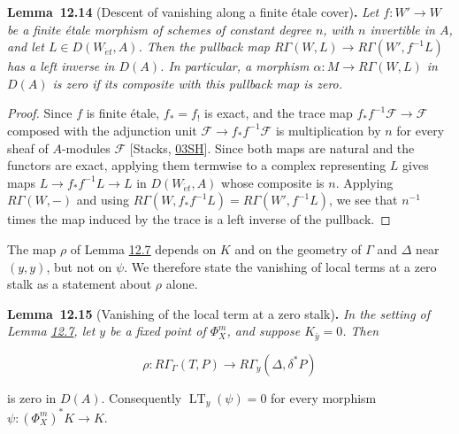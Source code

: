 \documentclass[11pt]{article}
\newenvironment{bpstatement}[2]{\par\addvspace{0.6\baselineskip}\noindent\textbf{#1}#2\textbf{.}\enspace\ignorespaces}
  {\par\addvspace{0.4\baselineskip}}
\newenvironment{bpstatementit}[2]{\begin{bpstatement}{#1}{#2}\itshape\ignorespaces}{\end{bpstatement}}
\begin{document}
\label{bp267}%
\begin{bpstatementit}{Lemma~12.14}{ (Descent of vanishing along a finite étale cover)}
Let \(f:W'\to W\) be a finite étale morphism of schemes of constant degree \(n\), with \(n\) invertible in \(A\), and let \(L\in D(W_{\acute{e}t},A)\). Then the pullback map \(R\Gamma(W,L)\to R\Gamma(W',f^{-1}L)\) has a left inverse in \(D(A)\). In particular, a morphism \(\alpha:M\to R\Gamma(W,L)\) in \(D(A)\) is zero if its composite with this pullback map is zero.
\end{bpstatementit}

\begin{proof}[{Proof}]\label{bp268}%
Since \(f\) is finite étale, \(f_*=f_!\) is exact, and the trace map \(f_*f^{-1}\mathcal F\to\mathcal F\) composed with the adjunction unit \(\mathcal F\to f_*f^{-1}\mathcal F\) is multiplication by \(n\) for every sheaf of \(A\)-modules \(\mathcal F\) [Stacks, \href{https://stacks.math.columbia.edu/tag/03SH}{03SH}]. Since both maps are natural and the functors are exact, applying them termwise to a complex representing \(L\) gives maps \(L\to f_*f^{-1}L\to L\) in \(D(W_{\acute{e}t},A)\) whose composite is \(n\). Applying \(R\Gamma(W,-)\) and using \(R\Gamma(W,f_*f^{-1}L)=R\Gamma(W',f^{-1}L)\), we see that \(n^{-1}\) times the map induced by the trace is a left inverse of the pullback.
\end{proof}

\label{bp269}%
The map \(\rho\) of Lemma \hyperref[bp246]{12.7} depends on \(K\) and on the geometry of \(\Gamma\) and \(\Delta\) near \((y,y)\), but not on \(\psi\). We therefore state the vanishing of local terms at a zero stalk as a statement about \(\rho\) alone.

\label{bp270}%
\begin{bpstatementit}{Lemma~12.15}{ (Vanishing of the local term at a zero stalk)}
In the setting of Lemma \hyperref[bp246]{12.7}, let \(y\) be a fixed point of \(\Phi_X^m\), and suppose \(K_{\bar y}=0\). Then

\[
\rho:R\Gamma_\Gamma(T,P)\longrightarrow R\Gamma_y(\Delta,\delta^*P)
\]

is zero in \(D(A)\). Consequently \(\operatorname{LT}_y(\psi)=0\) for every morphism \(\psi:(\Phi_X^m)^*K\to K\).
\end{bpstatementit}
\end{document}
